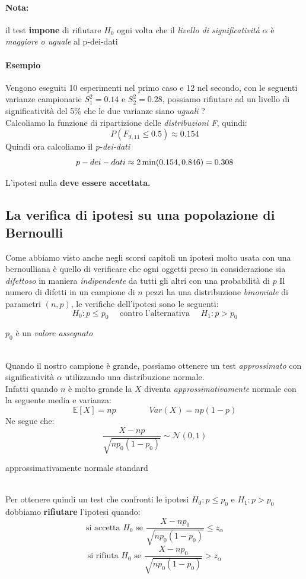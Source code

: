 \documentclass[]{article}
\newcommand{\ev}{\mathbb{E}[X]}
\renewcommand{\ev}[1]{\mathbb{E}\left[#1\right]}
\begin{document}
    \paragraph{Nota:} il test \textbf{impone} di rifiutare $H_0$ ogni volta che il \textit{livello di significatività} $\alpha$ è \textit{maggiore o uguale} al p-dei-dati
    \paragraph{Esempio} Vengono eseguiti 10 esperimenti nel primo caso e 12 nel secondo, con le seguenti varianze campionarie $S^2_1 = 0.14$ e $S^2_2 = 0.28$, possiamo rifiutare ad un livello di significatività del 5\% che le due varianze siano \textit{uguali} ? \\
    Calcoliamo la funzione di ripartizione delle \textit{distribuzioni F}, quindi:
    \[ P(F_{9,11} \leq 0.5) \approx \boldsymbol{0.154} \]
    Quindi ora calcoliamo il \textit{p-dei-dati}
    \[ p-dei-dati \approx 2 \min(0.154, \space 0.846) = 0.308 \]
    \centerline{L'ipotesi nulla \textbf{deve essere accettata. }}
    \subsection{La verifica di ipotesi su una popolazione di Bernoulli}
    Come abbiamo visto anche negli scorsi capitoli un ipotesi molto usata con una bernoulliana è quello di verificare che ogni oggetti preso in considerazione sia \textit{difettoso} in maniera \textit{indipendente} da tutti gli altri con una probabilità di $p$
    Il numero di difetti in un campione di $n$ pezzi ha una distribuzione \textit{binomiale} di parametri $(n, p)$, le verifiche dell'ipotesi sono le seguenti:
    \[ H_0 : p \leq p_0 \quad \text{ contro l'alternativa } \quad H_1 : p > p_0 \]
    \centerline{$p_0$ è un \textit{valore assegnato}} \\[2ex]
    Quando il nostro campione è grande, possiamo ottenere un test \textit{approssimato} con significatività $\alpha$ utilizzando una distribuzione normale. \\
    Infatti quando $n$ è molto grande la $X$ diventa \textit{approssimativamente} normale con la seguente media e varianza:
    \[ \ev{X} = np \qquad \qquad Var(X) = np (1-p) \]
    Ne segue che:
    \[ \frac{X - np}{\sqrt{np_0 (1- p_0)}} \sim \mathcal{N}(0,1) \]
    \centerline{approssimativamente normale standard} \\[2ex]
    Per ottenere quindi un test che confronti le ipotesi $H_0 : p \leq p_0$ e $H_1 : p > p_0$ dobbiamo \textbf{rifiutare} l'ipotesi quando:
    \[ \text{si accetta } H_0 \text{ se } \frac{X - np_0}{\sqrt{np_0 (1- p_0)}} \leq z_\alpha \]
    \[ \text{si rifiuta } H_0 \text{ se } \frac{X - np_0}{\sqrt{np_0 (1- p_0)}} > z_\alpha \]
\end{document}
